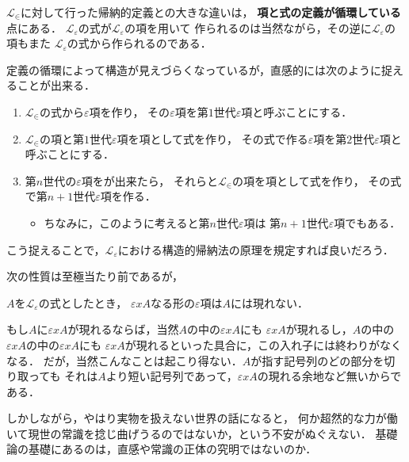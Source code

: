 	$\mathcal{L}_{\in}$に対して行った帰納的定義との大きな違いは，
	{\bf 項と式の定義が循環している}点にある．
	$\mathcal{L}_{\varepsilon}$の式が$\mathcal{L}_{\varepsilon}$の項を用いて
	作られるのは当然ながら，その逆に$\mathcal{L}_{\varepsilon}$の項もまた
	$\mathcal{L}_{\varepsilon}$の式から作られるのである．
	
	定義の循環によって構造が見えづらくなっているが，直感的には次のように捉えることが出来る．
	\begin{enumerate}
		\item $\mathcal{L}_{\in}$の式から$\varepsilon$項を作り，
			その$\varepsilon$項を第$1$世代$\varepsilon$項と呼ぶことにする．
		\item $\mathcal{L}_{\in}$の項と第$1$世代$\varepsilon$項を項として式を作り，
			その式で作る$\varepsilon$項を第$2$世代$\varepsilon$項と呼ぶことにする．
		\item 第$n$世代の$\varepsilon$項をが出来たら，
			それらと$\mathcal{L}_{\in}$の項を項として式を作り，
			その式で第$n+1$世代$\varepsilon$項を作る．
			
			\begin{itemize}
				\item ちなみに，このように考えると第$n$世代$\varepsilon$項は
					第$n+1$世代$\varepsilon$項でもある．
			\end{itemize}
	\end{enumerate}
	
	こう捉えることで，$\mathcal{L}_{\varepsilon}$における構造的帰納法の原理を規定すれば良いだろう．
	
	次の性質は至極当たり前であるが，
	
	\begin{screen}
		\begin{metathm}[無限入れ子は起こらない]
			$A$を$\mathcal{L}_{\varepsilon}$の式としたとき，
			$\varepsilon x A$なる形の$\varepsilon$項は$A$には現れない．
		\end{metathm}
	\end{screen}
	
	もし$A$に$\varepsilon x A$が現れるならば，当然$A$の中の$\varepsilon x A$にも
	$\varepsilon x A$が現れるし，$A$の中の$\varepsilon x A$の中の$\varepsilon x A$にも
	$\varepsilon x A$が現れるといった具合に，この入れ子には終わりがなくなる．
	だが，当然こんなことは起こり得ない．$A$が指す記号列のどの部分を切り取っても
	それは$A$より短い記号列であって，$\varepsilon x A$の現れる余地など無いからである．
	
	しかしながら，やはり実物を扱えない世界の話になると，
	何か超然的な力が働いて現世の常識を捻じ曲げうるのではないか，という不安がぬぐえない．
	基礎論の基礎にあるのは，直感や常識の正体の究明ではないのか．
	
